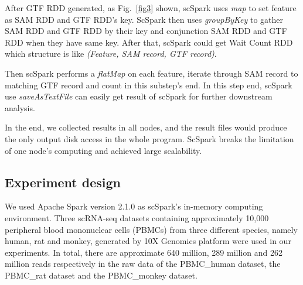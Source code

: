 \documentclass[conference]{IEEEtran}
\begin{document}
After GTF RDD generated, as Fig.~\ref{fig3} shown, scSpark uses \textit{map} to set feature as SAM RDD and GTF RDD's key.
ScSpark then uses \textit{groupByKey} to gather SAM RDD and GTF RDD by their key and conjunction SAM RDD and GTF RDD when they have same key.
After that, scSpark could get Wait Count RDD which structure is like \textit{(Feature, SAM record, GTF record)}.

Then scSpark performs a \textit{flatMap} on each feature, iterate through SAM record to matching GTF record and count in this substep's end.
In this step end, scSpark use \textit{saveAsTextFile} can easily get result of scSpark for further downstream analysis.

In the end, we collected results in all nodes, and the result files would produce the only output disk access in the whole program. 
ScSpark breaks the limitation of one node's computing and achieved large scalability. 

\subsection{Experiment design}
We used Apache Spark version 2.1.0 as scSpark's in-memory computing environment.
Three scRNA-seq datasets containing approximately 10,000 peripheral blood mononuclear cells (PBMCs) from three different species, namely human, rat and monkey, generated by 10X Genomics platform were used in our experiments.
In total, there are approximate 640 million, 289 million and 262 million reads respectively in the raw data of the PBMC\_human dataset, the PBMC\_rat dataset and the PBMC\_monkey dataset.
\end{document}
